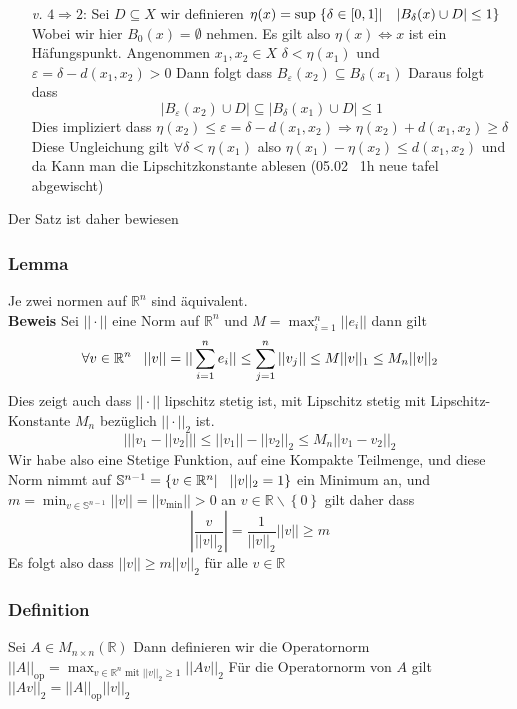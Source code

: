 \documentclass{article}
\newcommand{\smspc}{\hspace{0.3cm}}
\newcommand{\beweis}{\\\textbf{Beweis }}
\newcommand{\lemma}[1]{\subsubsection*{Lemma {#1}}}
\newcommand{\definition}[1]{\subsubsection*{Definition {#1}}}
\begin{document}
\begin{itemize}
{    Widerspricht doch dass $M$ unser supremum ist, daher gilt die behauptung, und $f$ nimmt dass maximum an. Für den minimum Kann man $-f$ betrachten.}
  \item[\textit{v.}]{$4 \Rightarrow 2$: Sei $D \subseteq X$ wir definieren $\eta(x)=\sup \left.\left\lbrace\delta\in [0,1]\right|\smspc|B_\delta (x)\cup D|\le 1 \right\rbrace$ Wobei wir hier $B_0(x)=\emptyset$ nehmen. Es gilt also
    $\eta(x)\Leftrightarrow x$ ist ein Häfungspunkt. Angenommen $x_1, x_2\in X$ $\delta<\eta(x_1)$ und $\varepsilon=\delta-d(x_1,x_2)>0$ Dann folgt dass $B_{\varepsilon}(x_2)\subseteq B_{\delta}(x_1)$ Daraus folgt dass
    \[|B_{\varepsilon}(x_2)\cup D|\subseteq |B_{\delta}(x_1)\cup D| \le 1\]Dies impliziert dass $\eta(x_2)\le \varepsilon=\delta-d(x_1,x_2) \Longrightarrow \eta(x_2)+d(x_1,x_2)\ge \delta$ Diese Ungleichung gilt $\forall \delta<\eta(x_1)$ also $\eta(x_1)-\eta(x_2)\le d(x_1,x_2)$ und da Kann man 
    die Lipschitzkonstante ablesen (05.02 ~1h neue tafel abgewischt)}
\end{itemize}
Der Satz ist daher bewiesen 
\lemma{} Je zwei normen auf $\mathbb{R}^n$ sind äquivalent.
\beweis Sei $||\cdot||$ eine Norm auf $\mathbb{R}^n$ und $M=\max_{i=1}^n||e_i||$ dann gilt \[\forall v\in \mathbb{R}^n\smspc||v||=||\sum_{i=1}^ne_i||\le \sum_{j=1}^n ||v_j||\le M||v||_1\le M_n||v||_2\] Dies zeigt auch dass $||\cdot||$ lipschitz stetig ist, mit Lipschitz stetig mit Lipschitz-Konstante $M_n$ bezüglich $||\cdot||_2$ ist. \[\left|||v_1-||v_2||\right|\le||v_1||-||v_2||_2 \le M_n||v_1-v_2||_2\]
Wir habe also eine Stetige Funktion, auf eine Kompakte Teilmenge, und diese Norm nimmt auf $\mathbb{S }^{n-1}=\left\lbrace v\in \mathbb{R}^n| \smspc ||v||_2=1\right\rbrace$ ein Minimum an, und $m=\min_{v\in \mathbb{S }^{n-1}}||v||=||v_{\text{min}}||>0$ an $v\in \mathbb{R}\backslash \left\lbrace0\right\rbrace$ gilt daher dass \[\left|\frac{v}{||v||_2}\right|=\frac{1}{||v||_2}||v||\ge m\] Es folgt also dass $||v||\ge m||v||_2$ für alle $v \in \mathbb{R}$
\definition{} Sei $A\in M_{n\times n}(\mathbb{R})$ Dann definieren wir die Operatornorm $||A||_{\text{op}}=\max_{v\in \mathbb{R}^n\text{ mit } ||v||_2\ge 1}||Av||_2$ Für die Operatornorm von $A$ gilt $||Av||_2=||A||_{\text{op}}||v||_2$
\end{document}
